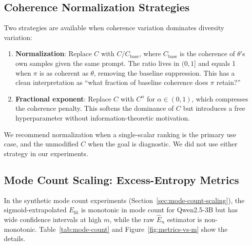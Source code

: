 \subsection{Coherence Normalization Strategies}\label{app:c-normalization}

Two strategies are available when coherence variation dominates diversity variation:
\begin{enumerate}[nosep]
    \item \textbf{Normalization}: Replace $C$ with $C / C_{\mathrm{base}}$, where $C_{\mathrm{base}}$ is the coherence of $\theta$'s own samples given the same prompt.
The ratio lives in $(0, 1]$ and equals 1 when $\pi$ is as coherent as $\theta$, removing the baseline suppression.
This has a clean interpretation as ``what fraction of baseline coherence does $\pi$ retain?''
    \item \textbf{Fractional exponent}: Replace $C$ with $C^\alpha$ for $\alpha \in (0, 1)$, which compresses the coherence penalty.
This softens the dominance of $C$ but introduces a free hyperparameter without information-theoretic motivation.
\end{enumerate}
We recommend normalization when a single-scalar ranking is the primary use case, and the unmodified $C$ when the goal is diagnostic.
We did not use either strategy in our experiments.
\fi

\subsection{Mode Count Scaling: Excess-Entropy Metrics}

In the synthetic mode count experiments (Section~\ref{sec:mode-count-scaling}), the sigmoid-extrapolated $E_{\mathrm{fit}}$ is monotonic in mode count for Qwen2.5-3B but has wide confidence intervals at high $m$, while the raw $\hat{E}_n$ estimator is non-monotonic.
Table~\ref{tab:mode-count} and Figure~\ref{fig:metrics-vs-m} show the details.

\begin{table}[!htbp]
\centering
\caption{Mode count scaling metrics for Qwen2.5-3B ($n=\modeCountNResponses$, \modeCountNDraws{} draws). $E_{\mathrm{fit}}$ is the sigmoid-extrapolated excess entropy; $a_n$ is the mean floor at $k=\modeCountNResponses$; $\sigma_\ell$ is per-byte coherence spread; $k_0$ is the sigmoid inflection point.
Confidence intervals are 95\% bootstrap. The high-$m$ rows ($m{\ge}8$) have $E_{\mathrm{fit}}$ CIs spanning more than half the mean and should be read as preliminary; the trend direction is robust but the point values are imprecise.}
\label{tab:mode-count}
\small

\end{table}


